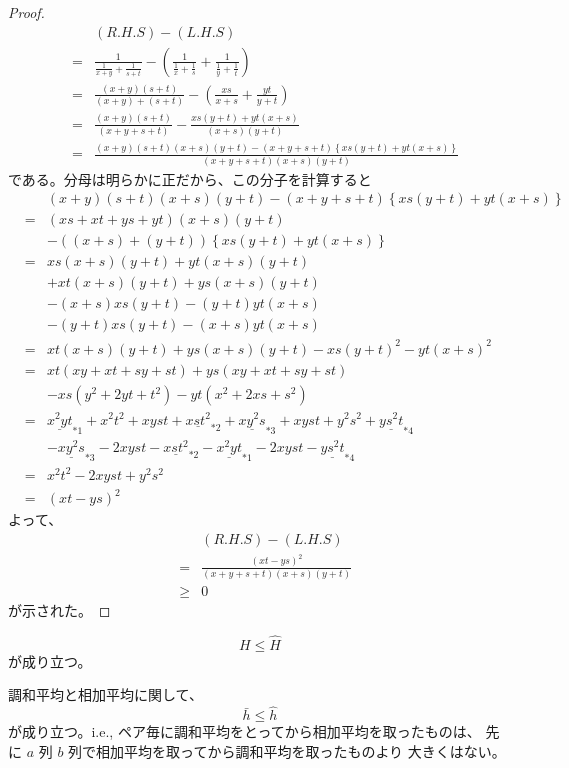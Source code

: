 \documentclass[12pt]{jsarticle}
\def\arithmean#1{\bar{#1}}
\def\arithsum#1{#1}
\def\harmmean#1{\hat{#1}}
\def\harmformula#1#2#3{\frac{#1}{\frac{1}{#2} + \frac{1}{#3}}}
\begin{document}
\begin{proof}
\begin{eqnarray}
&& (R.H.S) - (L.H.S) \nonumber \\
&=& \harmformula{1}{x + y}{s + t} -
\left( \harmformula{1}{x}{s} + \harmformula{1}{y}{t} \right) \\
&=& \frac{(x + y)(s + t)}{(x + y) + (s + t)}
- \left( \frac{x s}{x + s} + \frac{y t}{y + t} \right) \\
&=& \frac{(x + y)(s + t)}{(x + y + s + t)}
- \frac{x s (y + t) + y t (x + s)}{(x + s)(y + t)} \\
&=& \frac{(x+y)(s+t)(x+s)(y+t) - (x+y+s+t)
\left\{ xs(y+t) + yt(x+s) \right\} }
{ (x + y + s + t)(x + s)(y + t) }
\end{eqnarray}
である。分母は明らかに正だから、この分子を計算すると
\begin{eqnarray}
&& (x+y)(s+t)(x+s)(y+t) - (x+y+s+t)\left\{ xs(y+t) + yt(x+s) \right\}
\nonumber \\
&=& (xs + xt + ys + yt)(x + s)(y + t) \nonumber \\
&& - ((x + s) + (y + t)) \left\{ xs(y + t) + yt(x + s) \right\} \\
&=& xs(x + s)(y + t) + yt(x + s)(y + t) \nonumber \\
&& + xt(x + s)(y + t) + ys(x + s)(y +t) \nonumber \\
&& - (x + s)xs(y + t) - (y + t)yt(x + s) \nonumber \\
&& - (y + t)xs(y + t) - (x + s)yt(x + s) \\
&=& x t (x + s)(y + t) + y s (x + s)(y + t) - xs(y+t)^2 - yt(x+s)^2 \\
&=& xt(xy + xt + sy + st) + ys(xy + xt + sy + st) \nonumber \\
&& - xs(y^2 + 2yt + t^2) - yt(x^2 + 2xs +s^2) \\
&=& \underline{x^2yt}_{*1} + x^2t^2 + xyst + \underline{xst^2}_{*2}
+ \underline{xy^2s}_{*3} + xyst + y^2s^2 + \underline{ys^2t}_{*4} \nonumber \\
&& - \underline{xy^2s}_{*3} - 2xyst - \underline{xst^2}_{*2}
- \underline{x^2yt}_{*1} - 2xyst - \underline{ys^2t}_{*4} \\
&=& x^2t^2 - 2 xyst + y^2s^2 \\
&=& (xt - ys)^2
\end{eqnarray}
よって、
\begin{eqnarray}
&& (R.H.S) - (L.H.S) \nonumber \\
&=& \frac{(xt - ys)^2}{ (x + y + s + t)(x + s)(y +t) } \\
&\ge& 0
\end{eqnarray}
が示された。
\end{proof}

\begin{theorem}
\begin{equation}
\arithsum{H} \le \harmmean{H}
\end{equation}
が成り立つ。
\end{theorem}


\begin{corollary}
調和平均と相加平均に関して、
\begin{equation}
\arithmean{h} \le \harmmean{h}
\end{equation}
が成り立つ。i.e.,
ペア毎に調和平均をとってから相加平均を取ったものは、
先に $a$ 列 $b$ 列で相加平均を取ってから調和平均を取ったものより
大きくはない。
\end{corollary}
\end{document}
